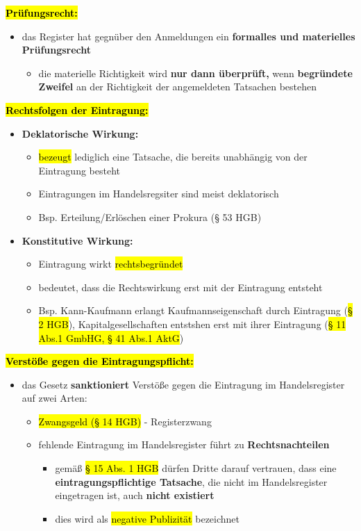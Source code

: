 \documentclass[a4paper, 10pt]{article}
\begin{document}
\noindent\textbf{\hl{Prüfungsrecht:}}
\begin{itemize}
    \item das Register hat gegnüber den Anmeldungen ein \textbf{formalles und materielles Prüfungsrecht}
    \begin{itemize}
        \item die materielle Richtigkeit wird \textbf{nur dann überprüft,} wenn \textbf{begründete Zweifel} an der Richtigkeit der angemeldeten Tatsachen bestehen
    \end{itemize}
\end{itemize}
\textbf{\hl{Rechtsfolgen der Eintragung:}}
\begin{itemize}
    \item \textbf{Deklatorische Wirkung:}
    \begin{itemize}
        \item \hl{bezeugt} lediglich eine Tatsache, die bereits unabhängig von der Eintragung besteht
        \item Eintragungen im Handelsregsiter sind meist deklatorisch 
        \item Bsp. Erteilung/Erlöschen einer Prokura (§ 53 HGB)
    \end{itemize}

    \item \textbf{Konstitutive Wirkung:}
    \begin{itemize}
        \item Eintragung wirkt \hl{rechtsbegründet}
        \item bedeutet, dass die Rechtswirkung erst mit der Eintragung entsteht 
        \item Bsp. Kann-Kaufmann erlangt Kaufmannseigenschaft durch Eintragung (\hl{§ 2 HGB}), Kapitalgesellschaften entstshen erst mit ihrer Eintragung (\hl{§ 11 Abs.1 GmbHG, § 41 Abs.1 AktG})
    \end{itemize}
\end{itemize}
\textbf{\hl{Verstöße gegen die Eintragungspflicht:}}
\begin{itemize}
    \item das Gesetz \textbf{sanktioniert} Verstöße gegen die Eintragung im Handelsregister auf zwei Arten:
    \begin{itemize}
        \item \hl{Zwangsgeld (§ 14 HGB)} - Registerzwang
        \item fehlende Eintragung im Handelsregister führt zu \textbf{Rechtsnachteilen}
            \begin{itemize}
                \item gemäß \hl{§ 15 Abs. 1 HGB} dürfen Dritte darauf vertrauen, dass eine \textbf{eintragungspflichtige Tatsache}, die nicht im Handelsregister eingetragen ist, auch \textbf{nicht existiert}
                \item dies wird als \hl{negative Publizität} bezeichnet 
            \end{itemize}
    \end{itemize}
\end{itemize}
\end{document}
